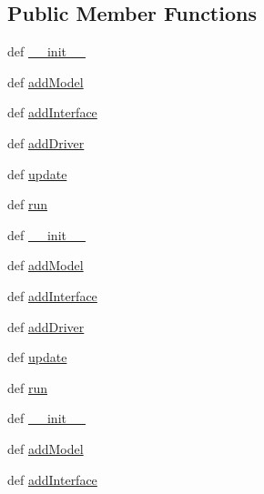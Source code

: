 \subsection*{Public Member Functions}
\begin{DoxyCompactItemize}
\item 
def \hyperlink{classinterface_1_1INTERFACE__CORE_1_1interface_a96fbbdd17999b9eb5430336f475c91ad}{\+\_\+\+\_\+init\+\_\+\+\_\+}
\item 
def \hyperlink{classinterface_1_1INTERFACE__CORE_1_1interface_a9e590fb5bf7673a7c77027f4ded29abb}{add\+Model}
\item 
def \hyperlink{classinterface_1_1INTERFACE__CORE_1_1interface_a7876b4f6147630ed64bde3864aed78c0}{add\+Interface}
\item 
def \hyperlink{classinterface_1_1INTERFACE__CORE_1_1interface_a54871907738176848a480584557cb65b}{add\+Driver}
\item 
def \hyperlink{classinterface_1_1INTERFACE__CORE_1_1interface_afca54b5f57d67ed5ba8b4dc110fa2647}{update}
\item 
def \hyperlink{classinterface_1_1INTERFACE__CORE_1_1interface_a2ba0b1d20f8ee0bf50b468bb82e91d4d}{run}
\item 
def \hyperlink{classinterface_1_1INTERFACE__CORE_1_1interface_a96fbbdd17999b9eb5430336f475c91ad}{\+\_\+\+\_\+init\+\_\+\+\_\+}
\item 
def \hyperlink{classinterface_1_1INTERFACE__CORE_1_1interface_a9e590fb5bf7673a7c77027f4ded29abb}{add\+Model}
\item 
def \hyperlink{classinterface_1_1INTERFACE__CORE_1_1interface_a7876b4f6147630ed64bde3864aed78c0}{add\+Interface}
\item 
def \hyperlink{classinterface_1_1INTERFACE__CORE_1_1interface_a54871907738176848a480584557cb65b}{add\+Driver}
\item 
def \hyperlink{classinterface_1_1INTERFACE__CORE_1_1interface_afca54b5f57d67ed5ba8b4dc110fa2647}{update}
\item 
def \hyperlink{classinterface_1_1INTERFACE__CORE_1_1interface_a2ba0b1d20f8ee0bf50b468bb82e91d4d}{run}
\item 
def \hyperlink{classinterface_1_1INTERFACE__CORE_1_1interface_a96fbbdd17999b9eb5430336f475c91ad}{\+\_\+\+\_\+init\+\_\+\+\_\+}
\item 
def \hyperlink{classinterface_1_1INTERFACE__CORE_1_1interface_a9e590fb5bf7673a7c77027f4ded29abb}{add\+Model}
\item 
def \hyperlink{classinterface_1_1INTERFACE__CORE_1_1interface_a7876b4f6147630ed64bde3864aed78c0}{add\+Interface}

\end{DoxyCompactItemize}
